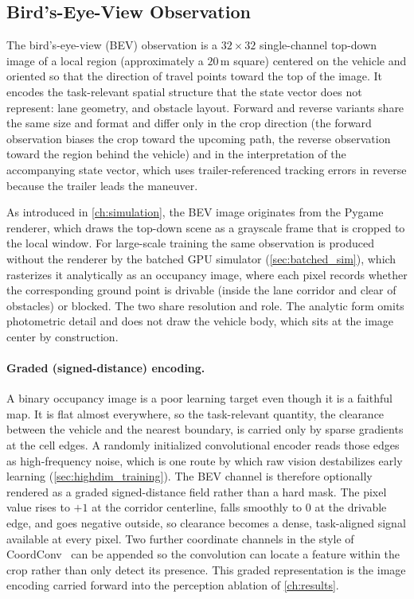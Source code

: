 \subsection{Bird's-Eye-View Observation}

The bird's-eye-view (BEV) observation is a $32 \times 32$ single-channel top-down image of a local region (approximately a $20$\,m square) centered on the vehicle and oriented so that the direction of travel points toward the top of the image. It encodes the task-relevant spatial structure that the state vector does not represent: lane geometry, and obstacle layout. Forward and reverse variants share the same size and format and differ only in the crop direction (the forward observation biases the crop toward the upcoming path, the reverse observation toward the region behind the vehicle) and in the interpretation of the accompanying state vector, which uses trailer-referenced tracking errors in reverse because the trailer leads the maneuver.

As introduced in \cref{ch:simulation}, the BEV image originates from the Pygame renderer, which draws the top-down scene as a grayscale frame that is cropped to the local window. For large-scale training the same observation is produced without the renderer by the batched GPU simulator (\cref{sec:batched_sim}), which rasterizes it analytically as an occupancy image, where each pixel records whether the corresponding ground point is drivable (inside the lane corridor and clear of obstacles) or blocked. The two share resolution and role. The analytic form omits photometric detail and does not draw the vehicle body, which sits at the image center by construction.

\paragraph{Graded (signed-distance) encoding.}
A binary occupancy image is a poor learning target even though it is a faithful map. It is flat almost everywhere, so the task-relevant quantity, the clearance between the vehicle and the nearest boundary, is carried only by sparse gradients at the cell edges. A randomly initialized convolutional encoder reads those edges as high-frequency noise, which is one route by which raw vision destabilizes early learning (\cref{sec:highdim_training}). The BEV channel is therefore optionally rendered as a graded signed-distance field rather than a hard mask. The pixel value rises to $+1$ at the corridor centerline, falls smoothly to $0$ at the drivable edge, and goes negative outside, so clearance becomes a dense, task-aligned signal available at every pixel. Two further coordinate channels in the style of CoordConv~\cite{liu2018coordconv} can be appended so the convolution can locate a feature within the crop rather than only detect its presence. This graded representation is the image encoding carried forward into the perception ablation of \cref{ch:results}.


